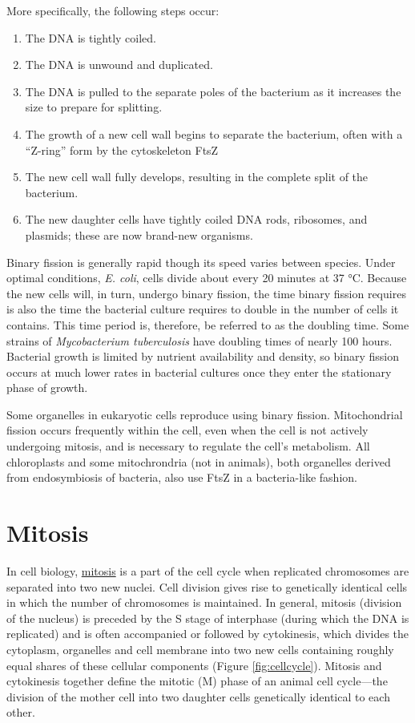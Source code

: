 More specifically, the following steps occur:

\begin{enumerate}
\def\labelenumi{\arabic{enumi}.}
\tightlist
\item
  The DNA is tightly coiled.
\item
  The DNA is unwound and duplicated.
\item
  The DNA is pulled to the separate poles of the bacterium as it increases the size to prepare for splitting.
\item
  The growth of a new cell wall begins to separate the bacterium, often with a ``Z-ring'' form by the cytoskeleton FtsZ
\item
  The new cell wall fully develops, resulting in the complete split of the bacterium.
\item
  The new daughter cells have tightly coiled DNA rods, ribosomes, and plasmids; these are now brand-new organisms.
\end{enumerate}

Binary fission is generally rapid though its speed varies between species. Under optimal conditions, \emph{E. coli}, cells divide about every 20 minutes at 37 °C. Because the new cells will, in turn, undergo binary fission, the time binary fission requires is also the time the bacterial culture requires to double in the number of cells it contains. This time period is, therefore, be referred to as the doubling time. Some strains of \emph{Mycobacterium tuberculosis} have doubling times of nearly 100 hours. Bacterial growth is limited by nutrient availability and density, so binary fission occurs at much lower rates in bacterial cultures once they enter the stationary phase of growth.

Some organelles in eukaryotic cells reproduce using binary fission. Mitochondrial fission occurs frequently within the cell, even when the cell is not actively undergoing mitosis, and is necessary to regulate the cell's metabolism. All chloroplasts and some mitochrondria (not in animals), both organelles derived from endosymbiosis of bacteria, also use FtsZ in a bacteria-like fashion.

\hypertarget{mitosis}{%
\section{Mitosis}\label{mitosis}}

In cell biology, \href{https://en.wikipedia.org/wiki/Mitosis}{mitosis} is a part of the cell cycle when replicated chromosomes are separated into two new nuclei. Cell division gives rise to genetically identical cells in which the number of chromosomes is maintained. In general, mitosis (division of the nucleus) is preceded by the S stage of interphase (during which the DNA is replicated) and is often accompanied or followed by cytokinesis, which divides the cytoplasm, organelles and cell membrane into two new cells containing roughly equal shares of these cellular components (Figure \ref{fig:cellcycle}). Mitosis and cytokinesis together define the mitotic (M) phase of an animal cell cycle---the division of the mother cell into two daughter cells genetically identical to each other.



